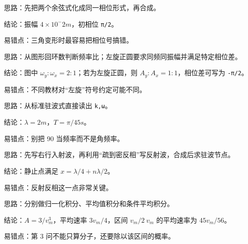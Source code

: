 \documentclass[12pt,a4paper]{ctexart}
\begin{document}
\begin{tcolorbox}[colback=white,colframe=black!55,title={一-8. 两同方向简谐振动合成的振幅与初相位}]
思路：先把两个余弦式化成同一相位形式，再合成。\par
结论：振幅 \(4×10^-2 m\)，初相位 \texttt{π/2}。\par
易错点：三角变形时最容易把相位号搞错。\par
\end{tcolorbox}

\begin{tcolorbox}[colback=white,colframe=black!55,title={一-9. 根据李萨如图判断角速度比；若为左旋正圆再求振幅比和相位差}]
思路：从图形回环数判断频率比；左旋正圆要求同频同振幅并满足特定相位差。\par
结论：图中 \(ω_y:ω_x=2:1\)；若为左旋正圆，则 \(A_y:A_x=1:1\)，相位差可写为 \texttt{-π/2}。\par
易错点：不同教材对“左旋”符号约定可能不同。\par
\end{tcolorbox}

\begin{tcolorbox}[colback=white,colframe=black!55,title={一-10. 已知驻波 \(y=2cos(πx)cos(90t+π/2)\)，求原波波长和周期}]
思路：从标准驻波式直接读出 \texttt{k,ω}。\par
结论：\(λ=2 m\)，\(T=π/45 s\)。\par
易错点：别把 90 当频率而不是角频率。\par
\end{tcolorbox}

\begin{tcolorbox}[colback=white,colframe=black!55,title={二-1. 一维横波从波疏介质入射到波密界面，写入射波、反射波并求静止点}]
思路：先写右行入射波，再利用“疏到密反相”写反射波，合成后求驻波节点。\par
结论：静止点满足 \(x=λ/4+nλ/2\)。\par
易错点：反射反相这一点非常关键。\par
\end{tcolorbox}

\begin{tcolorbox}[colback=white,colframe=black!55,title={二-2. 已知速率分布 \(f(v)=Av^2 (0≤v≤v_m)\)，求归一化常数、平均速率和区间平均速率}]
思路：分别做归一化积分、平均值积分和条件平均积分。\par
结论：\(A=3/v_m^3\)，平均速率 \(3v_m/4\)，区间 \(v_m/2~v_m\) 的平均速率为 \(45v_m/56\)。\par
易错点：第 3 问不能只算分子，还要除以该区间的概率。\par
\end{tcolorbox}
\end{document}
